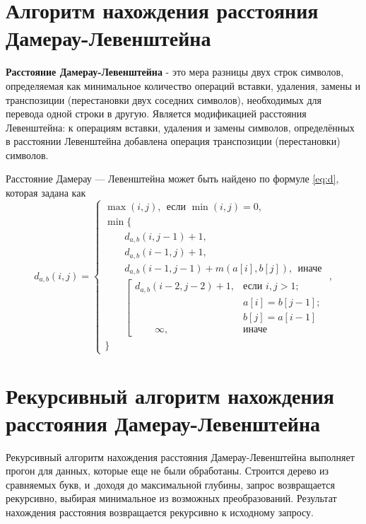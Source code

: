 \section{Алгоритм нахождения расстояния 
	Дамерау-Левенштейна}

\textbf{Расстояние Дамерау-Левенштейна} - это мера разницы двух строк символов, определяемая как минимальное количество операций вставки, удаления, замены и транспозиции (перестановки двух соседних символов), необходимых для перевода одной строки в другую. Является модификацией расстояния Левенштейна: к операциям вставки, удаления и замены символов, определённых в расстоянии Левенштейна добавлена операция транспозиции (перестановки) символов.

Расстояние Дамерау — Левенштейна может быть найдено по формуле \ref{eq:d}, которая задана как
\begin{equation}
	\label{eq:d}
	d_{a,b}(i, j) = \begin{cases}
		\max(i, j), ~~\text{если }\min(i, j) = 0,\\
		\min \lbrace \\
		\qquad d_{a,b}(i, j-1) + 1,\\
		\qquad d_{a,b}(i-1, j) + 1,\\
		\qquad d_{a,b}(i-1, j-1) + m(a[i], b[j]), ~~\text{иначе}\\
		\qquad \left[ \begin{array}{cc}d_{a,b}(i-2, j-2) + 1, &\text{если }i,j > 1;\\
			\qquad &\text{}a[i] = b[j-1]; \\
			\qquad &\text{}b[j] = a[i-1]\\
			\qquad \infty, & \text{иначе}\end{array}\right.\\
		\rbrace
	\end{cases},
\end{equation}

\section{Рекурсивный алгоритм нахождения 
	расстояния Дамерау-Левенштейна}

Рекурсивный алгоритм нахождения расстояния Дамерау-Левенштейна выполняет прогон для данных, которые еще не были обработаны. Строится дерево из сравняемых букв, и ,доходя до максимальной глубины, запрос возвращается рекурсивно, выбирая минимальное из возможных преобразований. Результат нахождения расстояния возвращается рекурсивно к исходному запросу.

